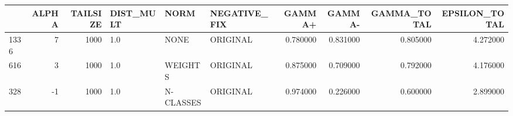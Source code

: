 \begin{tabular}{lrrlllrrrr}
\toprule
 & ALPHA & TAILSIZE & DIST_MULT & NORM & NEGATIVE_FIX & GAMMA+ & GAMMA- & GAMMA_TOTAL & EPSILON_TOTAL \\
\midrule
1336 & 7 & 1000 & 1.0 & NONE & ORIGINAL & 0.780000 & 0.831000 & 0.805000 & 4.272000 \\
616 & 3 & 1000 & 1.0 & WEIGHTS & ORIGINAL & 0.875000 & 0.709000 & 0.792000 & 4.176000 \\
328 & -1 & 1000 & 1.0 & N-CLASSES & ORIGINAL & 0.974000 & 0.226000 & 0.600000 & 2.899000 \\
\bottomrule
\end{tabular}
